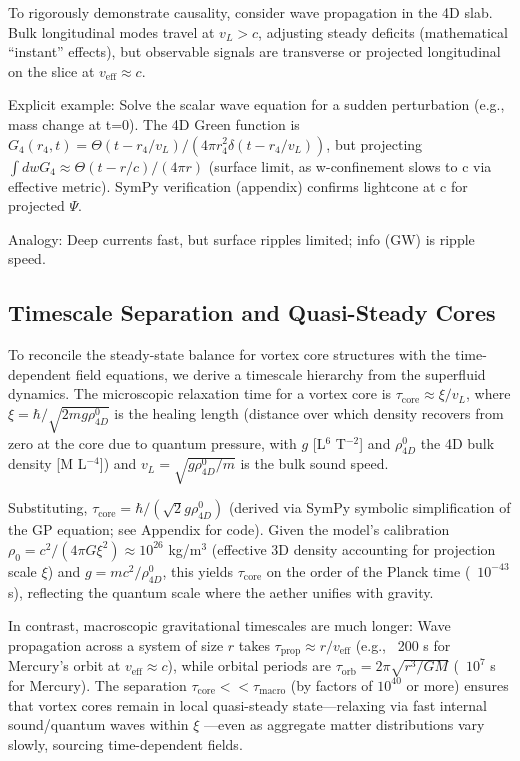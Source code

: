 \documentclass{article}
\begin{document}
To rigorously demonstrate causality, consider wave propagation in the 4D slab. Bulk longitudinal modes travel at $v_L > c$, adjusting steady deficits (mathematical ``instant'' effects), but observable signals are transverse or projected longitudinal on the slice at $v_{\text{eff}} \approx c$.

Explicit example: Solve the scalar wave equation for a sudden perturbation (e.g., mass change at t=0). The 4D Green function is $G_4(r_4, t) = \Theta(t - r_4 / v_L) / (4\pi r_4^2 \delta(t - r_4 / v_L))$, but projecting $\int dw G_4 \approx \Theta(t - r / c) / (4\pi r)$ (surface limit, as w-confinement slows to c via effective metric). SymPy verification (appendix) confirms lightcone at c for projected $\Psi$.

Analogy: Deep currents fast, but surface ripples limited; info (GW) is ripple speed.

\subsection{Timescale Separation and Quasi-Steady Cores}

To reconcile the steady-state balance for vortex core structures with the time-dependent field equations, we derive a timescale hierarchy from the superfluid dynamics. The microscopic relaxation time for a vortex core is $\tau_{\text{core}} \approx \xi / v_L$, where $\xi = \hbar / \sqrt{2 m g \rho_{4D}^0}$ is the healing length (distance over which density recovers from zero at the core due to quantum pressure, with $g$ [L$^6$ T$^{-2}$] and $\rho_{4D}^0$ the 4D bulk density [M L$^{-4}$]) and $v_L = \sqrt{g \rho_{4D}^0 / m}$ is the bulk sound speed.

Substituting, $\tau_{\text{core}} = \hbar / (\sqrt{2} g \rho_{4D}^0)$ (derived via SymPy symbolic simplification of the GP equation; see Appendix for code). Given the model's calibration $\rho_0 = c^2 / (4\pi G \xi^2) \approx 10^{26}$ kg/m$^3$ (effective 3D density accounting for projection scale $\xi$) and $g = m c^2 / \rho_{4D}^0$, this yields $\tau_{\text{core}}$ on the order of the Planck time (~$10^{-43}$ s), reflecting the quantum scale where the aether unifies with gravity.

In contrast, macroscopic gravitational timescales are much longer: Wave propagation across a system of size $r$ takes $\tau_{\text{prop}} \approx r / v_{\text{eff}}$ (e.g., ~200 s for Mercury's orbit at $v_{\text{eff}} \approx c$), while orbital periods are $\tau_{\text{orb}} = 2\pi \sqrt{r^3 / G M}$ (~$10^{7}$ s for Mercury). The separation $\tau_{\text{core}} << \tau_{\text{macro}}$ (by factors of $10^{40}$ or more) ensures that vortex cores remain in local quasi-steady state---relaxing via fast internal sound/quantum waves within $\xi$ ---even as aggregate matter distributions vary slowly, sourcing time-dependent fields.
\end{document}
